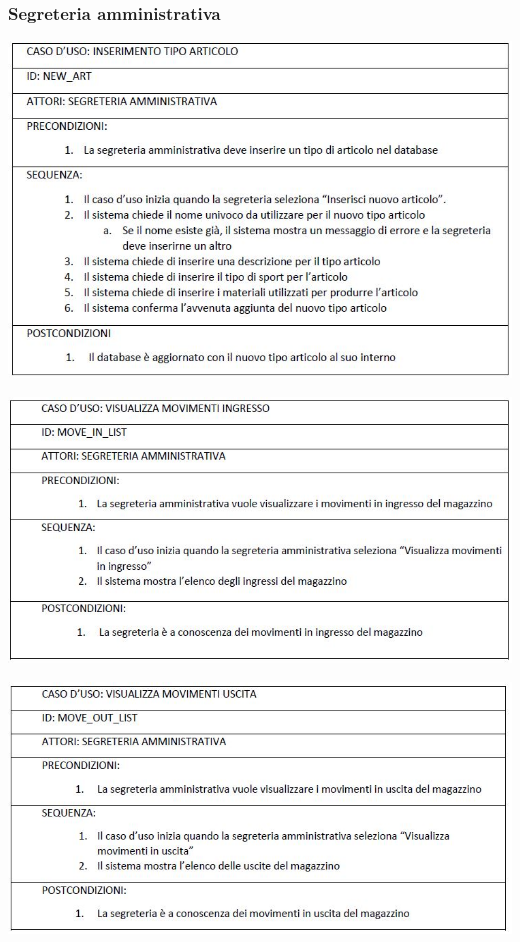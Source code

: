 \documentclass[a4paper]{article}
\begin{document}
	\subsubsection{Segreteria amministrativa}
	\begin{center}
		\includegraphics [scale=0.5] {new_article}
	\end{center}
	\begin{center}
		\includegraphics [scale=0.5] {move_in_list}
	\end{center}
	\begin{center}
		\includegraphics [scale=0.5] {move_out_list}
	\end{center}
	
\end{document}
